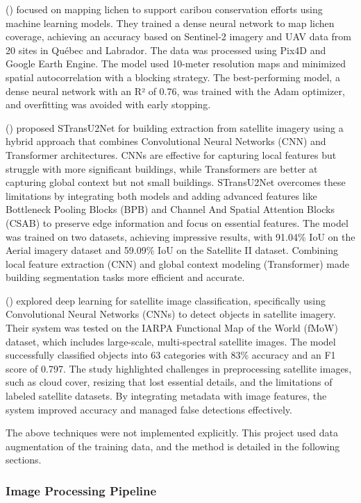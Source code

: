 \documentclass[10pt]{article}
\begin{document}
(\autocite{richardson2023dense}) focused on mapping lichen to support caribou conservation efforts using machine learning models. They trained a dense neural network to map lichen coverage, achieving an accuracy based on Sentinel-2 imagery and UAV data from 20 sites in Québec and Labrador. The data was processed using Pix4D and Google Earth Engine. The model used 10-meter resolution maps and minimized spatial autocorrelation with a blocking strategy. The best-performing model, a dense neural network with an R² of 0.76, was trained with the Adam optimizer, and overfitting was avoided with early stopping.

(\autocite{liu2024stransu2net}) proposed STransU2Net for building extraction from satellite imagery using a hybrid approach that combines Convolutional Neural Networks (CNN) and Transformer architectures. CNNs are effective for capturing local features but struggle with more significant buildings, while Transformers are better at capturing global context but not small buildings. STransU2Net overcomes these limitations by integrating both models and adding advanced features like Bottleneck Pooling Blocks (BPB) and Channel And Spatial Attention Blocks (CSAB) to preserve edge information and focus on essential features. The model was trained on two datasets, achieving impressive results, with 91.04\% IoU on the Aerial imagery dataset and 59.09\% IoU on the Satellite II dataset. Combining local feature extraction (CNN) and global context modeling (Transformer) made building segmentation tasks more efficient and accurate.

(\autocite{2010.06497}) explored deep learning for satellite image classification, specifically using Convolutional Neural Networks (CNNs) to detect objects in satellite imagery. Their system was tested on the IARPA Functional Map of the World (fMoW) dataset, which includes large-scale, multi-spectral satellite images. The model successfully classified objects into 63 categories with 83\% accuracy and an F1 score of 0.797. The study highlighted challenges in preprocessing satellite images, such as cloud cover, resizing that lost essential details, and the limitations of labeled satellite datasets. By integrating metadata with image features, the system improved accuracy and managed false detections effectively.

The above techniques were not implemented explicitly. This project used data augmentation of the training data, and the method is detailed in the following sections.


\subsubsection{Image Processing Pipeline}
\end{document}
